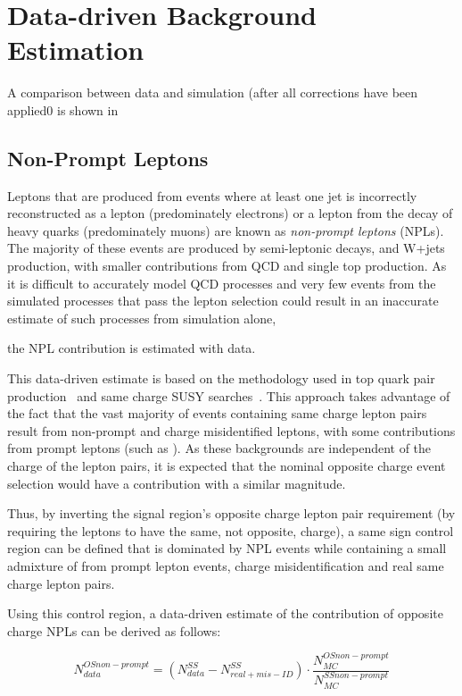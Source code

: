 \section{Data-driven Background Estimation}\label{sec:dataDrivenBackground}
A comparison between data and simulation (after all corrections have been applied0 is shown in 

\subsection{Non-Prompt Leptons}\label{sec:NPLs}
Leptons that are produced from events where at least one jet is incorrectly reconstructed as a lepton (predominately electrons) or a lepton from the decay of heavy quarks (predominately muons) are known as \emph{non-prompt leptons} (NPLs).
The majority of these events are produced by semi-leptonic \ttbar decays, and W+jets production, with smaller contributions from QCD and single top production.
As it is difficult to accurately model QCD processes and very few events from the simulated processes that pass the lepton selection  could result in an inaccurate estimate of such processes from simulation alone, 

the NPL contribution is estimated with data.

This data-driven estimate is based on the methodology used in top quark pair production~\cite{CMS:2016syx} and same charge SUSY searches~\cite{CMS:2015vqc}.
This approach takes advantage of the fact that the vast majority of events containing same charge lepton pairs result from non-prompt and charge misidentified leptons, with some contributions from prompt leptons (such as \ttV).
As these backgrounds are independent of the charge of the lepton pairs, it is expected that the nominal opposite charge event selection would have a contribution with a similar magnitude.

Thus, by inverting the signal region's opposite charge lepton pair requirement (\ie by requiring the leptons to have the same, not opposite, charge), a same sign control region can be defined that is dominated by NPL events while containing a small admixture of from prompt lepton events, charge misidentification and real same charge lepton pairs.

Using this control region, a data-driven estimate of the contribution of opposite charge NPLs can be derived as follows:

\begin{equation}\label{eq:NPL}
N_{data}^{OS non-prompt} = (N_{data}^{SS} - N^{SS}_{real + mis-ID}) \cdot \frac{N_{MC}^{OS non-prompt}}{N_{MC}^{SS non-prompt}}
\end{equation}

